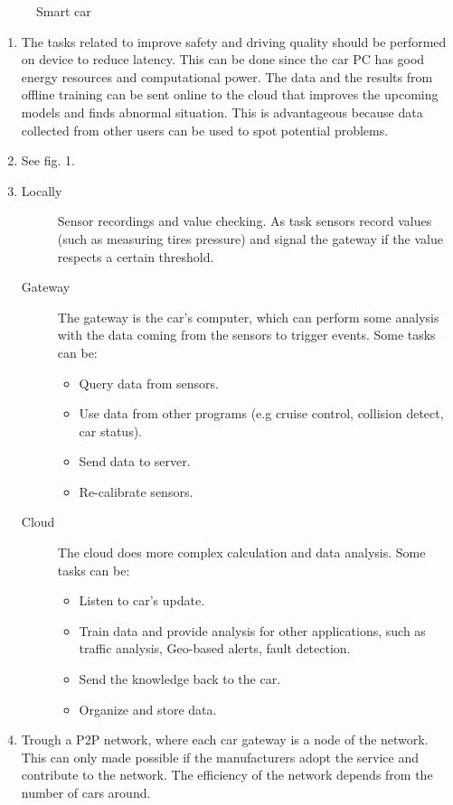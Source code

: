 \documentclass[a4paper, 12pt]{article}
\begin{document}
\begin{exercise}
\begin{figure}
    \centering
    \def\svgwidth{\linewidth}
     
    \caption{Smart car}
    \label{fig:inkscape_figure}
\end{figure}
\begin{enumerate}
    \item The tasks related to improve safety and driving quality should be performed
		on device to reduce latency. This can be done since the car PC has good
		energy resources and computational power. The data and the results from 
		offline training can be sent online to the cloud that improves the
		upcoming models and finds abnormal situation. This is advantageous
		because data collected from other users can be used to spot potential problems. 
	\item See fig. 1.
	\item 
		\begin{description}
		    \item[Locally] Sensor recordings and value checking. 
				As task sensors
				record values (such as measuring tires pressure) and signal the
			 gateway if the value respects a certain threshold. 
		 \item[Gateway] The gateway is the car's computer, which can perform some
			 analysis with the data coming from the sensors to trigger events.
			 Some tasks can be:
			 \begin{itemize}
			     \item Query data from sensors.
				 \item Use data from other programs (e.g cruise control,
					 collision detect, car status).
				\item Send data to server.
				\item Re-calibrate sensors.
			 \end{itemize}
		 \item[Cloud] The cloud does more complex calculation and data analysis.
			 Some tasks can be:
			 \begin{itemize}
			     \item Listen to car's update.
				\item Train data and provide analysis for other applications,
					such as traffic analysis, Geo-based alerts, fault detection. 
				\item Send the knowledge back to the car.
				\item Organize and store data.
			 \end{itemize}
		\end{description}
	\item Trough a P2P network, where each car gateway is a node of the network.
		This can only made possible if the manufacturers adopt the service and
		contribute to the network. The efficiency of the network depends from the
		number of cars around. 
\end{enumerate}
\end{exercise}
\end{document}
